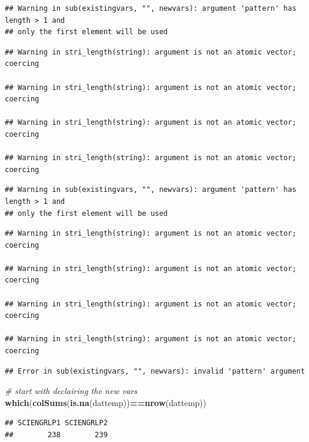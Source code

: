 \documentclass[
]{article}
\newenvironment{Shaded}{\begin{snugshade}}{\end{snugshade}}
\newcommand{\CommentTok}[1]{\textcolor[rgb]{0.56,0.35,0.01}{\textit{#1}}}
\newcommand{\KeywordTok}[1]{\textcolor[rgb]{0.13,0.29,0.53}{\textbf{#1}}}
\newcommand{\NormalTok}[1]{#1}
\newcommand{\OperatorTok}[1]{\textcolor[rgb]{0.81,0.36,0.00}{\textbf{#1}}}
\begin{document}
\begin{verbatim}
## Warning in sub(existingvars, "", newvars): argument 'pattern' has length > 1 and
## only the first element will be used
\end{verbatim}

\begin{verbatim}
## Warning in stri_length(string): argument is not an atomic vector; coercing

## Warning in stri_length(string): argument is not an atomic vector; coercing

## Warning in stri_length(string): argument is not an atomic vector; coercing

## Warning in stri_length(string): argument is not an atomic vector; coercing
\end{verbatim}

\begin{verbatim}
## Warning in sub(existingvars, "", newvars): argument 'pattern' has length > 1 and
## only the first element will be used
\end{verbatim}

\begin{verbatim}
## Warning in stri_length(string): argument is not an atomic vector; coercing

## Warning in stri_length(string): argument is not an atomic vector; coercing

## Warning in stri_length(string): argument is not an atomic vector; coercing

## Warning in stri_length(string): argument is not an atomic vector; coercing
\end{verbatim}

\begin{verbatim}
## Error in sub(existingvars, "", newvars): invalid 'pattern' argument
\end{verbatim}

\begin{Shaded}
\begin{Highlighting}[]
\CommentTok{# start with declairing the new vars}
\KeywordTok{which}\NormalTok{(}\KeywordTok{colSums}\NormalTok{(}\KeywordTok{is.na}\NormalTok{(dattemp))}\OperatorTok{==}\KeywordTok{nrow}\NormalTok{(dattemp))}
\end{Highlighting}
\end{Shaded}

\begin{verbatim}
## SCIENGRLP1 SCIENGRLP2 
##        238        239
\end{verbatim}
\end{document}
